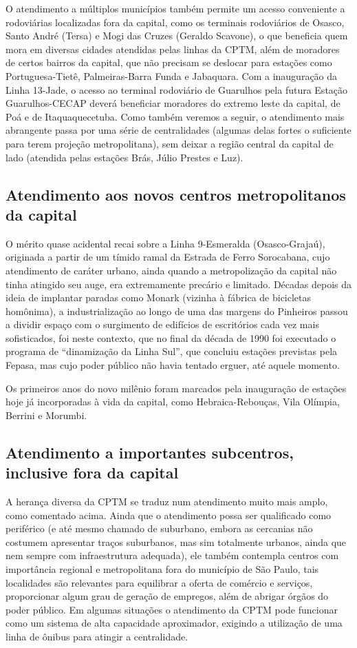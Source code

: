 \documentclass[11pt,fleqn]{book} %
\begin{document}
O atendimento a múltiplos municípios também permite um acesso conveniente a rodoviárias localizadas fora da capital, como os terminais rodoviários de Osasco, Santo André (Tersa) e Mogi das Cruzes (Geraldo Scavone), o que beneficia quem mora em diversas cidades atendidas pelas linhas da CPTM, além de moradores de certos bairros da capital, que não precisam se deslocar para estações como Portuguesa-Tietê, Palmeiras-Barra Funda e Jabaquara. Com a inauguração da Linha 13-Jade, o acesso ao terminal rodoviário de Guarulhos pela futura Estação Guarulhos-CECAP deverá beneficiar moradores do extremo leste da capital, de Poá e de Itaquaquecetuba. Como também veremos a seguir, o atendimento mais abrangente passa por uma série de centralidades (algumas delas fortes o suficiente para terem projeção metropolitana), sem deixar a região central da capital de lado (atendida pelas estações Brás, Júlio Prestes e Luz).

\subsection{Atendimento aos novos centros metropolitanos da capital}

O mérito quase acidental recai sobre a Linha 9-Esmeralda (Osasco-Grajaú), originada a partir de um tímido ramal da Estrada de Ferro Sorocabana, cujo atendimento de caráter urbano, ainda quando a metropolização da capital não tinha atingido seu auge, era extremamente precário e limitado. Décadas depois da ideia de implantar paradas como Monark (vizinha à fábrica de bicicletas homônima), a industrialização ao longo de uma das margens do Pinheiros passou a dividir espaço com o surgimento de edifícios de escritórios cada vez mais sofisticados, foi neste contexto, que no final da década de 1990 foi executado o programa de “dinamização da Linha Sul”, que concluiu estações previstas pela Fepasa, mas cujo poder público não havia tentado erguer, até aquele momento.

Os primeiros anos do novo milênio foram marcados pela inauguração de estações hoje já incorporadas à vida da capital, como Hebraica-Rebouças, Vila Olímpia, Berrini e Morumbi.

\subsection{Atendimento a importantes subcentros, inclusive fora da capital}

A herança diversa da CPTM se traduz num atendimento muito mais amplo, como comentado acima. Ainda que o atendimento possa ser qualificado como periférico (e até mesmo chamado de suburbano, embora as cercanias não costumem apresentar traços suburbanos, mas sim totalmente urbanos, ainda que nem sempre com infraestrutura adequada), ele também contempla centros com importância regional e metropolitana fora do município de São Paulo, tais localidades são relevantes para equilibrar a oferta de comércio e serviços, proporcionar algum grau de geração de empregos, além de abrigar órgãos do poder público. Em algumas situações o atendimento da CPTM pode funcionar como um sistema de alta capacidade aproximador, exigindo a utilização de uma linha de ônibus para atingir a centralidade.
\end{document}
